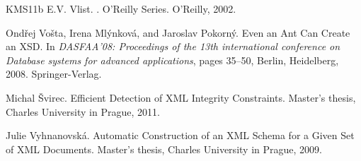 \begin{thebibliography}{KMS{\etalchar{+}}11b}
E.V. Vlist.
.
\newblock O'Reilly Series. O'Reilly, 2002.

Ond\v{r}ej Vo\v{s}ta, Irena Ml\'{y}nkov\'{a}, and Jaroslav Pokorn\'{y}.
\newblock Even an Ant Can Create an XSD.
\newblock In {\em DASFAA'08: Proceedings of the 13th international conference on Database systems for advanced applications}, pages 35--50, Berlin, Heidelberg, 2008. Springer-Verlag.

Michal \v{S}virec.
\newblock Efficient Detection of XML Integrity Constraints.
\newblock Master's thesis, Charles University in Prague, 2011.

Julie Vyhnanovsk\'{a}.
\newblock Automatic Construction of an XML Schema for a Given Set of XML Documents.
\newblock Master's thesis, Charles University in Prague, 2009.

\end{thebibliography}
